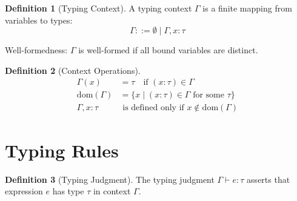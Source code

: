 \documentclass[11pt,twoside,openright]{book}
\theoremstyle{definition}
\newtheorem{definition}{Definition}[chapter]
\theoremstyle{plain}
\theoremstyle{remark}
\newcommand{\dom}{\mathrm{dom}}
\begin{document}
\begin{definition}[Typing Context]
\label{def:typing-context}
A typing context $\Gamma$ is a finite mapping from variables to types:
\[
\Gamma ::= \emptyset \mid \Gamma, x : \tau
\]

Well-formedness: $\Gamma$ is well-formed if all bound variables are distinct.
\end{definition}

\begin{definition}[Context Operations]
\label{def:context-ops}
\begin{align}
\Gamma(x) &= \tau \quad \text{if } (x : \tau) \in \Gamma \\
\dom(\Gamma) &= \{x \mid (x : \tau) \in \Gamma \text{ for some } \tau\} \\
\Gamma, x : \tau &\text{ is defined only if } x \notin \dom(\Gamma)
\end{align}
\end{definition}

\section{Typing Rules}

\begin{definition}[Typing Judgment]
\label{def:typing-judgment}
The typing judgment $\Gamma \vdash e : \tau$ asserts that expression $e$ has type $\tau$ in context $\Gamma$.
\end{definition}
\end{document}
